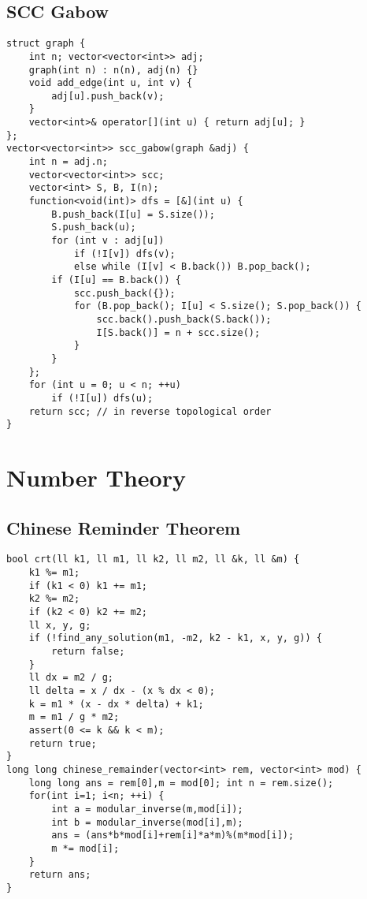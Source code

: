 \documentclass[landscape, 8pt, a4paper, oneside]{extarticle}
\begin{document}
\begin{multicols}{3}
\subsection{SCC Gabow}
\begin{verbatim}
struct graph {
    int n; vector<vector<int>> adj;
    graph(int n) : n(n), adj(n) {}
    void add_edge(int u, int v) {
        adj[u].push_back(v);
    }
    vector<int>& operator[](int u) { return adj[u]; }
};
vector<vector<int>> scc_gabow(graph &adj) {
    int n = adj.n;
    vector<vector<int>> scc;
    vector<int> S, B, I(n);
    function<void(int)> dfs = [&](int u) {
        B.push_back(I[u] = S.size());
        S.push_back(u);
        for (int v : adj[u])
            if (!I[v]) dfs(v);
            else while (I[v] < B.back()) B.pop_back();
        if (I[u] == B.back()) {
            scc.push_back({});
            for (B.pop_back(); I[u] < S.size(); S.pop_back()) {
                scc.back().push_back(S.back());
                I[S.back()] = n + scc.size();
            }
        }
    };
    for (int u = 0; u < n; ++u)
        if (!I[u]) dfs(u);
    return scc; // in reverse topological order
}
\end{verbatim}
\section{Number Theory}
\subsection{Chinese Reminder Theorem}
\begin{verbatim}
bool crt(ll k1, ll m1, ll k2, ll m2, ll &k, ll &m) {
    k1 %= m1;
    if (k1 < 0) k1 += m1;
    k2 %= m2;
    if (k2 < 0) k2 += m2;
    ll x, y, g;
    if (!find_any_solution(m1, -m2, k2 - k1, x, y, g)) {
        return false;
    }
    ll dx = m2 / g;
    ll delta = x / dx - (x % dx < 0);
    k = m1 * (x - dx * delta) + k1;
    m = m1 / g * m2;
    assert(0 <= k && k < m);
    return true;
}
long long chinese_remainder(vector<int> rem, vector<int> mod) {
    long long ans = rem[0],m = mod[0]; int n = rem.size();
    for(int i=1; i<n; ++i) {
        int a = modular_inverse(m,mod[i]);
        int b = modular_inverse(mod[i],m);
        ans = (ans*b*mod[i]+rem[i]*a*m)%(m*mod[i]);
        m *= mod[i];
    }
    return ans;
}
\end{verbatim}

\end{multicols}
\end{document}
